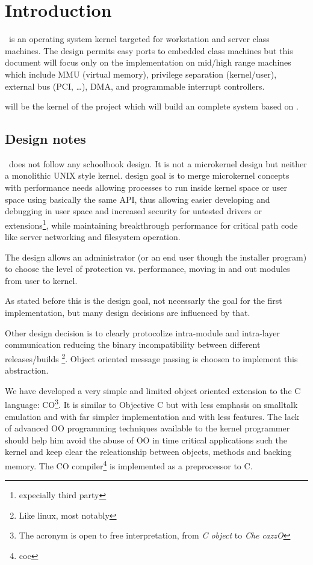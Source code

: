 \chapter{Introduction}

\acaros\ is an operating system kernel targeted for workstation and server class
machines. The design permits easy ports to embedded class machines but this
document will focus only on the implementation on mid/high range machines
which include MMU (virtual memory), privilege separation (kernel/user),
external bus (PCI, \ldots), DMA, and programmable interrupt controllers.

\acaros will be the kernel of the \kaos project which will build an complete system
based on \acaros.

\section{Design notes}

\acaros\ does not follow any schoolbook design. It is not a microkernel
design but neither a monolithic UNIX style kernel. \acaros design
goal is to merge microkernel concepts with performance needs
allowing processes to run inside kernel space or user space using basically
the same API, thus allowing easier developing and debugging in user space
and increased security for untested drivers or extensions\footnote{expecially third
party}, while maintaining breakthrough performance for critical path code
like server networking and filesystem operation. 

The design allows an administrator (or an end user though the installer program)
to choose the level of protection vs. performance, moving in and out modules from
user to kernel. 

As stated before this is the design goal, not necessarly the goal for the first implementation,
but many design decisions are influenced by that.

Other design decision is to clearly protocolize intra-module and intra-layer
communication reducing the binary incompatibility between different releases/builds
\footnote{Like linux, most notably}. Object oriented message passing is choosen
to implement this abstraction.
 
We have developed a very simple and limited object oriented extension to 
the C language: CO\footnote{The acronym is open to free interpretation, from \emph{C object}
to \emph{Che cazzO}}.
 It is similar to Objective C but with less emphasis on smalltalk emulation
and with far simpler implementation and with less features. The lack of advanced OO programming
techniques available to the kernel programmer should help him avoid the
abuse of OO in time critical applications such the kernel and keep clear
the releationship between objects, methods and backing memory.
The CO compiler\footnote{coc} is implemented as a preprocessor to C.

